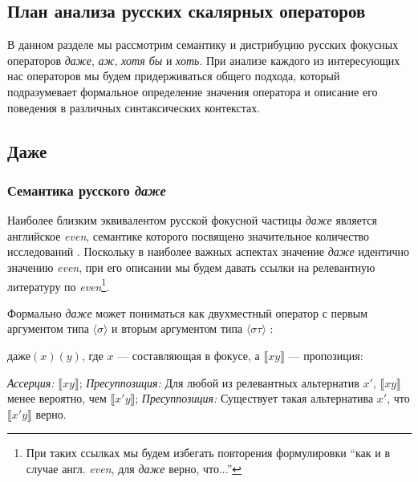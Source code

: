 \documentclass[a4paper, titlepage, 14pt]{article}
\begin{document}
\subsection{План анализа русских скалярных операторов} \label{additivityClassification}

В данном разделе мы рассмотрим семантику и дистрибуцию русских фокусных операторов \textit{даже}, \textit{аж}, \textit{хотя бы} и \textit{хоть}. При анализе каждого из интересующих нас операторов мы будем придерживаться общего подхода, который подразумевает формальное определение значения оператора и описание его поведения в различных синтаксических контекстах.

\subsection{Даже}

\subsubsection{Семантика русского \textit{даже}}

Наиболее близким эквивалентом русской фокусной частицы \textit{даже} является английское \textit{even}, семантике которого посвящено значительное количество исследований \citep{horn1969presuppositional,stalnaker1974pragmatic,rullmann1997even,iatridou2016our,kay1990even}. Поскольку в наиболее важных аспектах значение \textit{даже} идентично значению \textit{even}, при его описании мы будем давать ссылки на релевантную литературу по \textit{even}\footnote{При таких ссылках мы будем избегать повторения формулировки ``как и в случае англ. \textit{even}, для \textit{даже} верно, что...''}.

\medskip

Формально \textit{даже} может пониматься как двухместный оператор с первым аргументом типа $ \langle \sigma \rangle $ и вторым аргументом типа $ \langle \sigma \tau \rangle $ \citep{wagner2006association}:

\begin{exe}
    \ex $ \textit{даже}(x)(y) $, где $ x $ --- составляющая в фокусе, а $ \llbracket xy \rrbracket $ --- пропозиция: \begin{xlist}
        \ex \textit{Ассерция:} $ \llbracket xy \rrbracket $;
        \ex \textit{Пресуппозиция:} Для любой из релевантных альтернатив $ x' $, $ \llbracket xy \rrbracket $ менее вероятно, чем $ \llbracket x'y \rrbracket $;
        \ex \textit{Пресуппозиция:} Существует такая альтернатива $ x' $, что $ \llbracket x'y \rrbracket $ верно.
    \end{xlist}
\end{exe}
\end{document}
